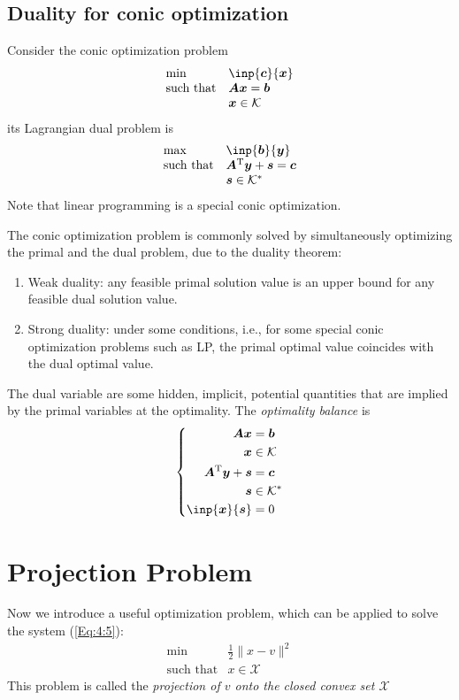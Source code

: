 \subsection{Duality for conic optimization}
Consider the conic optimization problem
\[
\begin{array}{ll}
\min&\inp{\bm c}{\bm x}\\
\mbox{such that}&\bm{Ax}=\bm b\\
&\bm x\in\mathcal{K}
\end{array}
\]
its Lagrangian dual problem is
\[
\begin{array}{ll}
\max&\inp{\bm b}{\bm y}\\
\mbox{such that}&\bm A\trans\bm y+\bm s=\bm c\\
&\bm s\in\mathcal{K}^*
\end{array}
\]
Note that linear programming is a special conic optimization.

The conic optimization problem is commonly solved by simultaneously optimizing the primal and the dual problem, due to the duality theorem:
\begin{enumerate}
\item
Weak duality: any feasible primal solution value is an upper bound for any feasible dual solution value.
\item
Strong duality: under some conditions, i.e., for some special conic optimization problems such as LP, the primal optimal value coincides with the dual optimal value.
\end{enumerate} 

The dual variable are some hidden, implicit, potential quantities that are implied by the primal variables at the optimality. The \emph{optimality balance} is
\begin{equation}\label{Eq:4:5}
\left\{
\begin{aligned}
\bm{Ax}&=\bm b\\
\bm x&\in\mathcal{K}\\
\bm A\trans\bm y+\bm s&=\bm c\\
\bm s&\in\mathcal{K}^*\\
\inp{\bm x}{\bm s}&=0
\end{aligned}
\right.
\end{equation}

\section{Projection Problem}

Now we introduce a useful optimization problem, which can be applied to solve the system (\ref{Eq:4:5}):
\begin{equation}
\begin{array}{ll}
\min&\frac{1}{2}\|x-v\|^2\\
\mbox{such that}&x\in\mathcal{X}
\end{array}
\end{equation}
This problem is called the \emph{projection of $v$ onto the closed convex set $\mathcal{X}$}

